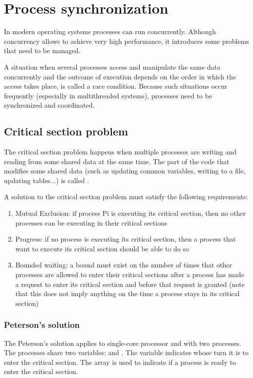 \chapter{Process synchronization}

In modern operating systems processes can run concurrently. Although concurrency allows to achieve very high performance, it introduces some problems that need to be managed.

A situation when several processes access and manipulate the same data concurrently and the outcome of execution depends on the order in which the access takes place, is called a race condition. Because such situations occur frequently (especially in multithreaded systems), processes need to be synchronized and coordinated.

\section{Critical section problem}
The critical section problem happens when multiple processes are writing and reading from some shared data at the same time. The part of the code that modifies some shared data (such as updating common variables, writing to a file, updating tables...) is called .

A solution to the critical section problem must satisfy the following requirements:
\begin{enumerate}
    \item Mutual Exclusion: if process Pi is executing its critical section, then no other processes can be executing in their critical sections
    \item Progress: if no process is executing its critical section, then a process that want to execute its critical section should be able to do so
    \item Bounded waiting: a bound must exist on the number of times that other processes are allowed to enter their critical sections after a process has made a request to enter its critical section and before that request is granted (note that this does not imply anything on the time a process stays in its critical section)
\end{enumerate}

\subsection{Peterson's solution}
The Peterson's solution applies to single-core processor and with two processes. The processes share two variables:  and . The  variable indicates whose turn it is to enter the critical section. The  array is used to indicate if a process is ready to enter the critical section.

